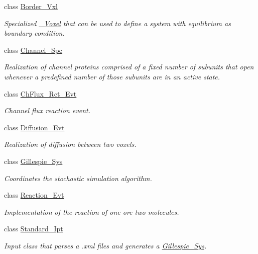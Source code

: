 \begin{DoxyCompactItemize}
class \hyperlink{classnw_1_1_border___vxl}{Border\+\_\+\+Vxl}
\begin{DoxyCompactList}\small\item\em Specialized \hyperlink{classnw_1_1___voxel}{\+\_\+\+Voxel} that can be used to define a system with equilibrium as boundary condition. \end{DoxyCompactList}\item 
class \hyperlink{classnw_1_1_channel___spc}{Channel\+\_\+\+Spc}
\begin{DoxyCompactList}\small\item\em Realization of channel proteins comprised of a fixed number of subunits that open whenever a predefined number of those subunits are in an active state. \end{DoxyCompactList}\item 
class \hyperlink{classnw_1_1_ch_flux___rct___evt}{Ch\+Flux\+\_\+\+Rct\+\_\+\+Evt}
\begin{DoxyCompactList}\small\item\em Channel flux reaction event. \end{DoxyCompactList}\item 
class \hyperlink{classnw_1_1_diffusion___evt}{Diffusion\+\_\+\+Evt}
\begin{DoxyCompactList}\small\item\em Realization of diffusion between two voxels. \end{DoxyCompactList}\item 
class \hyperlink{classnw_1_1_gillespie___sys}{Gillespie\+\_\+\+Sys}
\begin{DoxyCompactList}\small\item\em Coordinates the stochastic simulation algorithm. \end{DoxyCompactList}\item 
class \hyperlink{classnw_1_1_reaction___evt}{Reaction\+\_\+\+Evt}
\begin{DoxyCompactList}\small\item\em Implementation of the reaction of one ore two molecules. \end{DoxyCompactList}\item 
class \hyperlink{classnw_1_1_standard___ipt}{Standard\+\_\+\+Ipt}
\begin{DoxyCompactList}\small\item\em Input class that parses a .xml files and generates a \hyperlink{classnw_1_1_gillespie___sys}{Gillespie\+\_\+\+Sys}. \end{DoxyCompactList}\item 

\end{DoxyCompactItemize}
